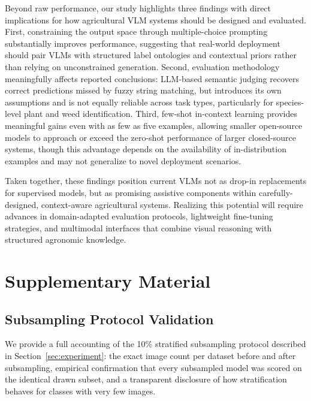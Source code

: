\documentclass[10pt,letterpaper]{article}
\begin{document}
Beyond raw performance, our study highlights three findings with direct implications for how agricultural VLM systems should be designed and evaluated. First, constraining the output space through multiple-choice prompting substantially improves performance, suggesting that real-world deployment should pair VLMs with structured label ontologies and contextual priors rather than relying on unconstrained generation. Second, evaluation methodology meaningfully affects reported conclusions: LLM-based semantic judging recovers correct predictions missed by fuzzy string matching, but introduces its own assumptions and is not equally reliable across task types, particularly for species-level 
plant and weed identification. Third, few-shot in-context learning provides meaningful gains even with as few as five examples, allowing smaller open-source models to approach or exceed the zero-shot performance of larger closed-source systems, though this advantage depends on the availability of in-distribution examples and may not generalize to novel deployment scenarios.

Taken together, these findings position current VLMs not as drop-in replacements for supervised models, but as promising assistive components within carefully-designed, context-aware agricultural systems. Realizing this potential will require advances in domain-adapted evaluation protocols, lightweight fine-tuning strategies, and multimodal interfaces that combine visual reasoning with structured agronomic knowledge.

{\small


}

\section{Supplementary Material}
\label{sec:supplementary}

\subsection{Subsampling Protocol Validation}
\label{sec:supp_subsampling}

We provide a full accounting of the 10\% stratified subsampling protocol described in Section~\ref{sec:experiment}: the exact image count per dataset before and after subsampling, empirical confirmation that every subsampled model was scored on the identical drawn subset, and a transparent disclosure of how stratification behaves for classes with very few images.
\end{document}
